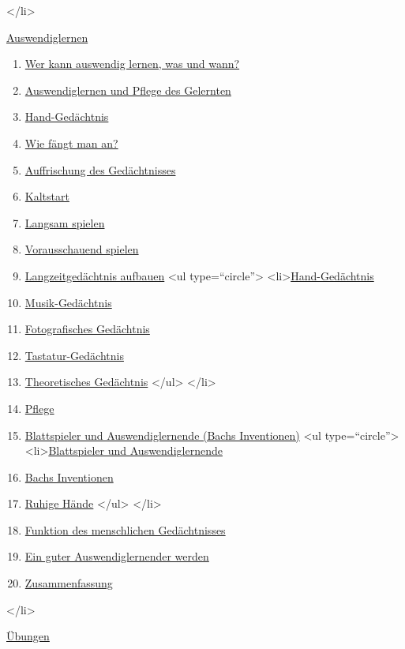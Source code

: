  </li>
 \item \hyperlink{c1iii6}{Auswendiglernen}
  \begin{enumerate}[label={\alph*.}] 
   <li>\hyperlink{c1iii6a}{Warum auswendig lernen?}
   \item \hyperlink{c1iii6b}{Wer kann auswendig lernen, was und wann?}
   \item \hyperlink{c1iii6c}{Auswendiglernen und Pflege des Gelernten}
   \item \hyperlink{c1iii6d}{Hand-Gedächtnis}
   \item \hyperlink{c1iii6e}{Wie fängt man an?}
   \item \hyperlink{c1iii6f}{Auffrischung des Gedächtnisses}
   \item \hyperlink{c1iii6g}{Kaltstart}
   \item \hyperlink{c1iii6h}{Langsam spielen}
   \item \hyperlink{c1iii6i}{Vorausschauend spielen}
   \item \hyperlink{c1iii6j}{Langzeitgedächtnis aufbauen}
    <ul type=\enquote{circle}>
     <li>\hyperlink{c1iii6hand}{Hand-Gedächtnis}
     \item \hyperlink{c1iii6musik}{Musik-Gedächtnis}
     \item \hyperlink{c1iii6foto}{Fotografisches Gedächtnis}
     \item \hyperlink{c1iii6tastatur}{Tastatur-Gedächtnis}
     \item \hyperlink{c1iii6theorie}{Theoretisches Gedächtnis}
    </ul>
   </li>
   \item \hyperlink{c1iii6k}{Pflege}
   \item \hyperlink{c1iii6l}{Blattspieler und Auswendiglernende (Bachs Inventionen)}
    <ul type=\enquote{circle}>
     <li>\hyperlink{c1iii6l}{Blattspieler und Auswendiglernende}
     \item \hyperlink{c1iii6l2}{Bachs Inventionen}
     \item \hyperlink{ruhig}{Ruhige Hände}
    </ul>
   </li>
   \item \hyperlink{c1iii6m}{Funktion des menschlichen Gedächtnisses}
   \item \hyperlink{c1iii6n}{Ein guter Auswendiglernender werden}
   \item \hyperlink{c1iii6o}{Zusammenfassung}
   \end{enumerate}
 </li>
 \item \hyperlink{c1iii7}{Übungen}

